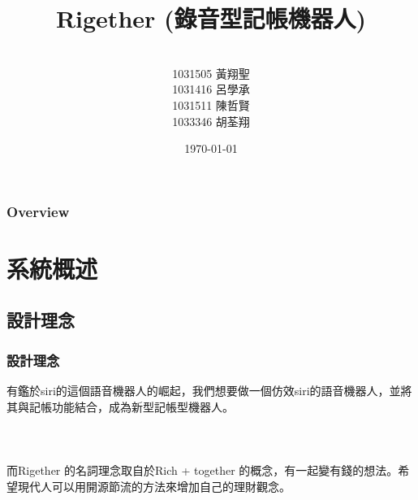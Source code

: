 \documentclass{beamer}
\title[Short title]{Rigether (錄音型記帳機器人)} %
\author{\\
1031505 黃翔聖\\
1031416 呂學承\\
1031511 陳哲賢 \\
1033346 胡荃翔\\
} %
\institute[UCLA] %
{
}
\date{\today} %
\begin{document}
\begin{frame}
\titlepage %

\end{frame}

\begin{frame}
\frametitle{Overview} %
\tableofcontents %

\end{frame}



\section{系統概述} %

\subsection{設計理念} %

\begin{frame}
\frametitle{設計理念}
有鑑於siri的這個語音機器人的崛起，我們想要做一個仿效siri的語音機器人，並將其與記帳功能結合，成為新型記帳型機器人。\\~\\~\\~\\

而Rigether 的名詞理念取自於Rich + together 的概念，有一起變有錢的想法。希望現代人可以用開源節流的方法來增加自己的理財觀念。
\end{frame}
\end{document}
